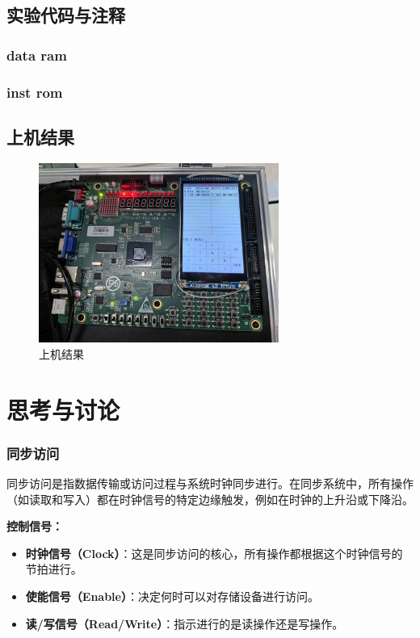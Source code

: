 \documentclass[AutoFakeBold]{LZUThesis}
\begin{document}
\section{实验代码与注释}
\subsection{data ram}

\subsection{inst rom}


\section{上机结果}
\begin{figure}[htbp]
    \centering
    \includegraphics[width=0.7\textwidth]{img/fpga}
    \caption{上机结果}
\end{figure}

\chapter{思考与讨论}
\subsection*{同步访问}

同步访问是指数据传输或访问过程与系统时钟同步进行。在同步系统中，所有操作（如读取和写入）都在时钟信号的特定边缘触发，例如在时钟的上升沿或下降沿。

\textbf{控制信号：}
\begin{itemize}
    \item \textbf{时钟信号（Clock）}：这是同步访问的核心，所有操作都根据这个时钟信号的节拍进行。
    \item \textbf{使能信号（Enable）}：决定何时可以对存储设备进行访问。
    \item \textbf{读/写信号（Read/Write）}：指示进行的是读操作还是写操作。
\end{itemize}
\end{document}
